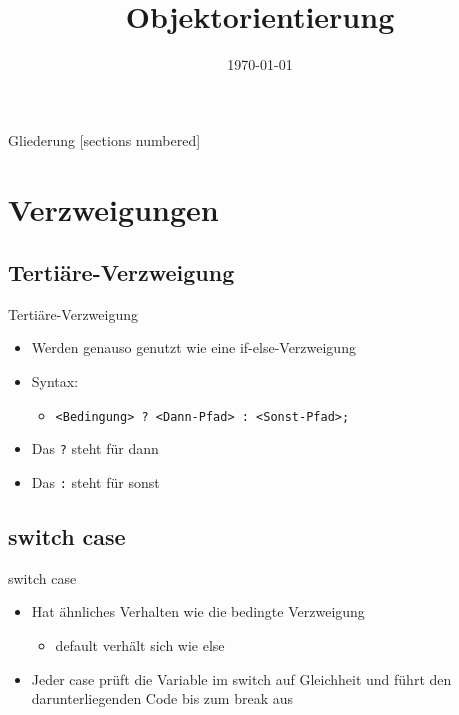 



\title{Objektorientierung}
\date{\today}




\maketitle

\begin{frame}{Gliederung}
	[sections numbered]
	\tableofcontents
\end{frame}

\section{Verzweigungen}
\subsection{Tertiäre-Verzweigung}
\begin{frame}{Tertiäre-Verzweigung}
	\begin{itemize}
		\item Werden genauso genutzt wie eine if-else-Verzweigung
		\item Syntax:
		\begin{itemize}
			\item \texttt{\alert{<Bedingung>} ? \alert{<Dann-Pfad>} : \alert{<Sonst-Pfad>};}
		\end{itemize}
		\item Das \alert{\texttt{?}} steht für \alert{dann}
		\item Das \alert{\texttt{:}} steht für \alert{sonst}
	\end{itemize}		
	
\end{frame}

\subsection{switch case}
\begin{frame}{switch case}
	\begin{itemize}
		\item Hat ähnliches Verhalten wie die bedingte Verzweigung
		\begin{itemize}
			\item \alert{default} verhält sich wie \alert{else}
		\end{itemize}
		\item Jeder \alert{case} prüft die Variable im \alert{switch} auf Gleichheit und führt den darunterliegenden Code bis zum \alert{break} aus
	\end{itemize}
	
\end{frame}

